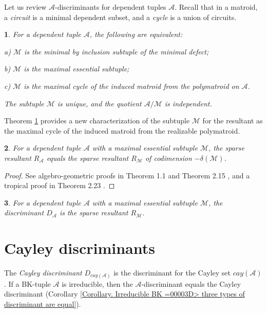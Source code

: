 \documentclass[11pt]{article}
\theoremstyle{plain}
\newtheorem{thm}{\protect\theoremname}[section]
\theoremstyle{definition}
\theoremstyle{remark}
\theoremstyle{plain}
\theoremstyle{plain}
\theoremstyle{plain}
\newtheorem{cor}[thm]{\protect\corollaryname}
\theoremstyle{definition}
\providecommand{\corollaryname}{Corollary}
\providecommand{\theoremname}{Theorem}
\begin{document}
Let us review $\mathscr{A}$-discriminants for dependent tuples $\mathscr{A}$.
Recall that in a matroid, a \textit{circuit} is a minimal dependent
subset, and a \textit{cycle} is a union of circuits.
\begin{thm}
\label{Theorem. A/M  is linearly independent}\textup{\cite{pokidkin_combinatorics_2025}}
For a dependent tuple $\mathscr{A}$, the following are equivalent:

a) $\mathscr{M}$ is the minimal by inclusion subtuple of the minimal
defect;

b) $\mathscr{M}$ is the maximal essential subtuple;

c) $\mathscr{M}$ is the maximal cycle of the induced matroid from
the polymatroid on $\mathscr{A}$.

The subtuple $\mathscr{M}$ is unique, and the quotient $\mathscr{A}/\mathscr{M}$
is independent.
\end{thm}

Theorem \ref{Theorem. A/M  is linearly independent} provides a new
characterization of the subtuple $\mathscr{M}$ for the resultant
\cite{sturmfels_newton_1994} as the maximal cycle of the induced
matroid from the realizable polymatroid.
\begin{thm}
For a dependent tuple $\mathscr{A}$ with a maximal essential subtuple
$\mathscr{M}$, the sparse resultant $R_{\mathscr{A}}$ equals the
sparse resultant $R_{\mathscr{M}}$ of codimension $-\delta(\mathscr{M})$.
\end{thm}

\begin{proof}
See algebro-geometric proofs in Theorem 1.1 \cite{sturmfels_newton_1994}
and Theorem 2.15 \cite{esterov_determinantal_2007}, and a tropical
proof in Theorem 2.23 \cite{jensen_computing_2013}.
\end{proof}
\begin{cor}
\label{Corollary. Discriminants for linearly dependent tuples}For
a dependent tuple $\mathscr{A}$ with a maximal essential subtuple
$\mathscr{M}$, the discriminant $D_{\mathscr{A}}$ is the sparse
resultant $R_{\mathscr{M}}$.
\end{cor}


\section{\label{Section. Cayley discriminants}Cayley discriminants}

The \textit{Cayley discriminant} $D_{cay(\mathscr{A})}$ is the discriminant
for the Cayley set $cay(\mathscr{A})$. If a BK-tuple $\mathscr{A}$
is irreducible, then the $\mathscr{A}$-discriminant equals the Cayley
discriminant (Corollary \ref{Corollary. Irreducible BK =00003D> three types of discriminant are equal}).
\end{document}
